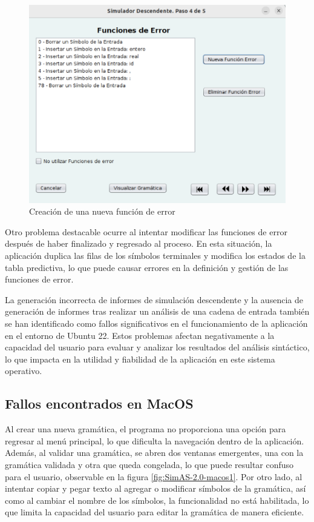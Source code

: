 \begin{figure}[htp]
 	\begin{center}
      \includegraphics[scale=0.3]{figuras/Cap3/SimAS2/fallos/ubuntu2.png} 
       \caption{Creación de una nueva función de error}\label{fig:SimAS-2.0-ubuntu2}
 	\end{center}
\end{figure}

Otro problema destacable ocurre al intentar modificar las funciones de error después de haber finalizado y regresado al proceso. En esta situación, la aplicación duplica las filas de los símbolos terminales y modifica los estados de la tabla predictiva, lo que puede causar errores en la definición y gestión de las funciones de error.

La generación incorrecta de informes de simulación descendente y la ausencia de generación de informes tras realizar un análisis de una cadena de entrada también se han identificado como fallos significativos en el funcionamiento de la aplicación en el entorno de Ubuntu 22. Estos problemas afectan negativamente a la capacidad del usuario para evaluar y analizar los resultados del análisis sintáctico, lo que impacta en la utilidad y fiabilidad de la aplicación en este sistema operativo.

\subsection{Fallos encontrados en MacOS}

Al crear una nueva gramática, el programa no proporciona una opción para regresar al menú principal, lo que dificulta la navegación dentro de la aplicación. Además, al validar una gramática, se abren dos ventanas emergentes, una con la gramática validada y otra que queda congelada, lo que puede resultar confuso para el usuario, observable en la figura \ref{fig:SimAS-2.0-macos1}. Por otro lado, al intentar copiar y pegar texto al agregar o modificar símbolos de la gramática, así como al cambiar el nombre de los símbolos, la funcionalidad no está habilitada, lo que limita la capacidad del usuario para editar la gramática de manera eficiente.

